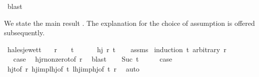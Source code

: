 \begin{isabellebody}
\ blast\isanewline
{}\isamarkupfalse%
%
\endisatagproof
{\isafoldproof}%
%
\isadelimproof
%
\endisadelimproof
%
\isadelimdocument
%
\endisadelimdocument
%
\isatagdocument
%
\isamarkuptrue%
%
\endisatagdocument
{\isafolddocument}%
%
\isadelimdocument
%
\endisadelimdocument
%
\begin{isamarkuptext}%
We state the main result . The explanation for the choice of assumption is offered subsequently.%
\end{isamarkuptext}\isamarkuptrue%
\isamarkupfalse%
\ hales{\isacharunderscore}{\kern0pt}jewett{\isacharcolon}{\kern0pt}\isanewline
\ \ \ {\isachardoublequoteopen}{\isasymnot}{\isacharparenleft}{\kern0pt}r\ {\isacharequal}{\kern0pt}\ {}\ {\isasymand}\ t\ {\isacharequal}{\kern0pt}\ {}{\isacharparenright}{\kern0pt}{\isachardoublequoteclose}\ \isanewline
\ \ \ {\isachardoublequoteopen}hj\ r\ t{\isachardoublequoteclose}\isanewline
%
\isadelimproof
\ \ %
\endisadelimproof
%
\isatagproof
{}\isamarkupfalse%
\ assms\isanewline
{}\isamarkupfalse%
\ {\isacharparenleft}{\kern0pt}induction\ t\ arbitrary{\isacharcolon}{\kern0pt}\ r{\isacharparenright}{\kern0pt}\isanewline
\ \ \isamarkupfalse%
\ {}\isanewline
\ \ \isamarkupfalse%
\ \isamarkupfalse%
\ {\isacharquery}{\kern0pt}case\ \isamarkupfalse%
\ hj{\isacharunderscore}{\kern0pt}r{\isacharunderscore}{\kern0pt}nonzero{\isacharunderscore}{\kern0pt}t{\isacharunderscore}{\kern0pt}{}{\isacharbrackleft}{\kern0pt}of\ r{\isacharbrackright}{\kern0pt}\ \isamarkupfalse%
\ blast\isanewline
{}\isamarkupfalse%
\isanewline
\ \ \isamarkupfalse%
\ {\isacharparenleft}{\kern0pt}Suc\ t{\isacharparenright}{\kern0pt}\isanewline
\ \ \isamarkupfalse%
\ \isamarkupfalse%
\ {\isacharquery}{\kern0pt}case\ \isamarkupfalse%
\ hj{\isacharunderscore}{\kern0pt}t{\isacharunderscore}{\kern0pt}{}{\isacharbrackleft}{\kern0pt}of\ r{\isacharbrackright}{\kern0pt}\ hj{\isacharunderscore}{\kern0pt}imp{\isacharunderscore}{\kern0pt}lhj{\isacharbrackleft}{\kern0pt}of\ t{\isacharbrackright}{\kern0pt}\ lhj{\isacharunderscore}{\kern0pt}imp{\isacharunderscore}{\kern0pt}hj{\isacharbrackleft}{\kern0pt}of\ t\ r{\isacharbrackright}{\kern0pt}\ \isamarkupfalse%
\ auto\isanewline
{}\isamarkupfalse%

\end{isabellebody}
